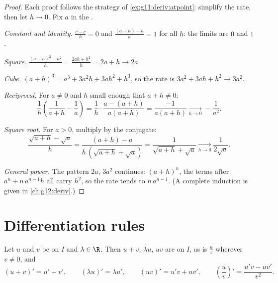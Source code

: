 \begin{proof}
Each proof follows the strategy of \cref{ex:g11:deriv:atpoint}: simplify
the rate, then let $h \to 0$. Fix $a$ in the .

\emph{Constant and identity.} $\frac{c - c}{h} = 0$ and
$\frac{(a+h) - a}{h} = 1$ for all $h$: the limits are $0$ and $1$.

\emph{Square.} $\frac{(a+h)^2 - a^2}{h} = \frac{2ah + h^2}{h} = 2a + h
\to 2a$.

\emph{Cube.} $(a+h)^3 = a^3 + 3a^2h + 3ah^2 + h^3$, so the rate is
$3a^2 + 3ah + h^2 \to 3a^2$.

\emph{Reciprocal.} For $a \neq 0$ and $h$ small enough that
$a + h \neq 0$:
\[
\frac{1}{h}\left(\frac{1}{a+h} - \frac{1}{a}\right)
= \frac{1}{h} \cdot \frac{a - (a+h)}{a(a+h)}
= \frac{-1}{a(a+h)}
\xrightarrow[h \to 0]{} -\frac{1}{a^2}.
\]

\emph{Square root.} For $a > 0$, multiply by the conjugate:
\[
\frac{\sqrt{a+h} - \sqrt a}{h}
= \frac{(a + h) - a}{h\,(\sqrt{a+h} + \sqrt a)}
= \frac{1}{\sqrt{a+h} + \sqrt a}
\xrightarrow[h \to 0]{} \frac{1}{2\sqrt a}.
\]

\emph{General power.} The pattern $2a$, $3a^2$ continues: 
$(a+h)^n$, the terms after $a^n + n\,a^{n-1}h$ all carry $h^2$, so the
rate tends to $n\,a^{n-1}$. (A complete induction is given in
\cref{ch:g12:deriv}.)
\end{proof}

\section{Differentiation rules}

\begin{theorem}[Operations]\label{thm:g11:deriv:rules}
Let $u$ and $v$ be  on $I$ and $\lambda \in \R$. Then
$u + v$, $\lambda u$, $uv$ are  on $I$, as is
$\frac{u}{v}$ wherever $v \neq 0$, and
\[
(u+v)' = u' + v', \qquad
(\lambda u)' = \lambda u', \qquad
(uv)' = u'v + uv', \qquad
\left(\frac{u}{v}\right)' = \frac{u'v - uv'}{v^2}.
\]
\end{theorem}

